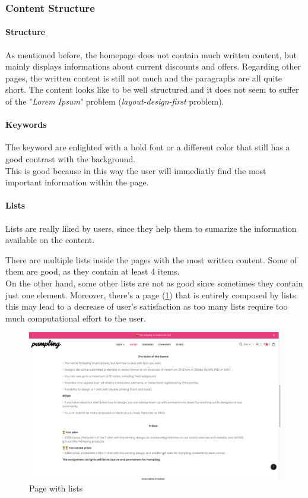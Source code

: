 \subsubsection{Content Structure}
\paragraph{Structure}
As mentioned before, the homepage does not contain much written content, but mainly displays informations about current discounts
and offers.
Regarding other pages, the written content is still not much and the paragraphs are all quite short. 
The content looks like to be well structured and it does not seem to suffer of the "\textit{Lorem Ipsum}" 
problem (\textit{layout-design-first} problem). \\

\paragraph{Keywords}
The keyword are enlighted with a bold font or a different color that still has a good contrast with the background.\\
This is good because in this way the user will immediatly find the most important information within the page.

\paragraph{Lists}
Lists are really liked by users, since they help them to sumarize the information available on the content.

There are multiple lists inside the pages with the most written content. Some of them are good, as they contain
at least 4 items. \\
On the other hand, some other lists are not as good since sometimes they contain just one element. 
Moreover, there's a page (\cref{fig:lists}) that is 
entirely composed by lists: this may lead to a decrease of user's satisfaction as too many lists require too much computational
effort to the user.

\begin{figure}[h!]
	\centering
	\includegraphics[scale=0.225]{images/lists.png}
	\caption{Page with lists}
	\label{fig:lists}
\end{figure}

